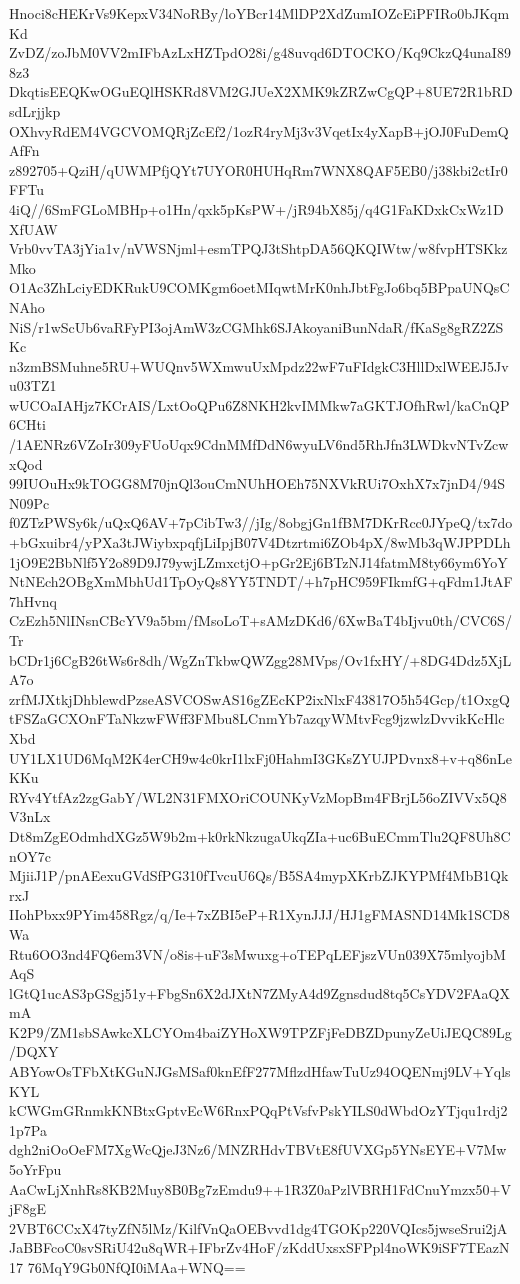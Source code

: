 Hnoci8cHEKrVs9KepxV34NoRBy/loYBcr14MlDP2XdZumIOZcEiPFIRo0bJKqmKd
ZvDZ/zoJbM0VV2mIFbAzLxHZTpdO28i/g48uvqd6DTOCKO/Kq9CkzQ4unaI898z3
DkqtisEEQKwOGuEQlHSKRd8VM2GJUeX2XMK9kZRZwCgQP+8UE72R1bRDsdLrjjkp
OXhvyRdEM4VGCVOMQRjZcEf2/1ozR4ryMj3v3VqetIx4yXapB+jOJ0FuDemQAfFn
z892705+QziH/qUWMPfjQYt7UYOR0HUHqRm7WNX8QAF5EB0/j38kbi2ctIr0FFTu
4iQ//6SmFGLoMBHp+o1Hn/qxk5pKsPW+/jR94bX85j/q4G1FaKDxkCxWz1DXfUAW
Vrb0vvTA3jYia1v/nVWSNjml+esmTPQJ3tShtpDA56QKQIWtw/w8fvpHTSKkzMko
O1Ac3ZhLciyEDKRukU9COMKgm6oetMIqwtMrK0nhJbtFgJo6bq5BPpaUNQsCNAho
NiS/r1wScUb6vaRFyPI3ojAmW3zCGMhk6SJAkoyaniBunNdaR/fKaSg8gRZ2ZSKc
n3zmBSMuhne5RU+WUQnv5WXmwuUxMpdz22wF7uFIdgkC3HllDxlWEEJ5Jvu03TZ1
wUCOaIAHjz7KCrAIS/LxtOoQPu6Z8NKH2kvIMMkw7aGKTJOfhRwl/kaCnQP6CHti
/1AENRz6VZoIr309yFUoUqx9CdnMMfDdN6wyuLV6nd5RhJfn3LWDkvNTvZcwxQod
99IUOuHx9kTOGG8M70jnQl3ouCmNUhHOEh75NXVkRUi7OxhX7x7jnD4/94SN09Pc
f0ZTzPWSy6k/uQxQ6AV+7pCibTw3//jIg/8obgjGn1fBM7DKrRcc0JYpeQ/tx7do
+bGxuibr4/yPXa3tJWiybxpqfjLiIpjB07V4Dtzrtmi6ZOb4pX/8wMb3qWJPPDLh
1jO9E2BbNlf5Y2o89D9J79ywjLZmxctjO+pGr2Ej6BTzNJ14fatmM8ty66ym6YoY
NtNEch2OBgXmMbhUd1TpOyQs8YY5TNDT/+h7pHC959FIkmfG+qFdm1JtAF7hHvnq
CzEzh5NlINsnCBcYV9a5bm/fMsoLoT+sAMzDKd6/6XwBaT4bIjvu0th/CVC6S/Tr
bCDr1j6CgB26tWs6r8dh/WgZnTkbwQWZgg28MVps/Ov1fxHY/+8DG4Ddz5XjLA7o
zrfMJXtkjDhblewdPzseASVCOSwAS16gZEcKP2ixNlxF43817O5h54Gcp/t1OxgQ
tFSZaGCXOnFTaNkzwFWff3FMbu8LCnmYb7azqyWMtvFcg9jzwlzDvvikKcHlcXbd
UY1LX1UD6MqM2K4erCH9w4c0krI1lxFj0HahmI3GKsZYUJPDvnx8+v+q86nLeKKu
RYv4YtfAz2zgGabY/WL2N31FMXOriCOUNKyVzMopBm4FBrjL56oZIVVx5Q8V3nLx
Dt8mZgEOdmhdXGz5W9b2m+k0rkNkzugaUkqZIa+uc6BuECmmTlu2QF8Uh8CnOY7c
MjiiJ1P/pnAEexuGVdSfPG310fTvcuU6Qs/B5SA4mypXKrbZJKYPMf4MbB1QkrxJ
IIohPbxx9PYim458Rgz/q/Ie+7xZBI5eP+R1XynJJJ/HJ1gFMASND14Mk1SCD8Wa
Rtu6OO3nd4FQ6em3VN/o8is+uF3sMwuxg+oTEPqLEFjszVUn039X75mlyojbMAqS
lGtQ1ucAS3pGSgj51y+FbgSn6X2dJXtN7ZMyA4d9Zgnsdud8tq5CsYDV2FAaQXmA
K2P9/ZM1sbSAwkcXLCYOm4baiZYHoXW9TPZFjFeDBZDpunyZeUiJEQC89Lg/DQXY
ABYowOsTFbXtKGuNJGsMSaf0knEfF277MflzdHfawTuUz94OQENmj9LV+YqlsKYL
kCWGmGRnmkKNBtxGptvEcW6RnxPQqPtVsfvPskYILS0dWbdOzYTjqu1rdj21p7Pa
dgh2niOoOeFM7XgWcQjeJ3Nz6/MNZRHdvTBVtE8fUVXGp5YNsEYE+V7Mw5oYrFpu
AaCwLjXnhRs8KB2Muy8B0Bg7zEmdu9++1R3Z0aPzlVBRH1FdCnuYmzx50+VjF8gE
2VBT6CCxX47tyZfN5lMz/KilfVnQaOEBvvd1dg4TGOKp220VQIcs5jwseSrui2jA
JaBBFcoC0svSRiU42u8qWR+IFbrZv4HoF/zKddUxsxSFPpl4noWK9iSF7TEazN17
76MqY9Gb0NfQI0iMAa+WNQ==
